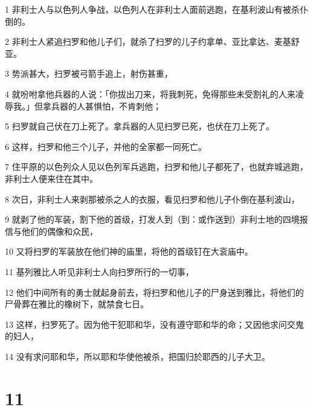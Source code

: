 \par 1 非利士人与以色列人争战，以色列人在非利士人面前逃跑，在基利波山有被杀仆倒的。
\par 2 非利士人紧追扫罗和他儿子们，就杀了扫罗的儿子约拿单、亚比拿达、麦基舒亚。
\par 3 势派甚大，扫罗被弓箭手追上，射伤甚重，
\par 4 就吩咐拿他兵器的人说：「你拔出刀来，将我刺死，免得那些未受割礼的人来凌辱我。」但拿兵器的人甚惧怕，不肯刺他；
\par 5 扫罗就自己伏在刀上死了。拿兵器的人见扫罗已死，也伏在刀上死了。
\par 6 这样，扫罗和他三个儿子，并他的全家都一同死亡。
\par 7 住平原的以色列众人见以色列军兵逃跑，扫罗和他儿子都死了，也就弃城逃跑，非利士人便来住在其中。
\par 8 次日，非利士人来剥那被杀之人的衣服，看见扫罗和他儿子仆倒在基利波山，
\par 9 就剥了他的军装，割下他的首级，打发人到（到：或作送到）非利士地的四境报信与他们的偶像和众民，
\par 10 又将扫罗的军装放在他们神的庙里，将他的首级钉在大衮庙中。
\par 11 基列雅比人听见非利士人向扫罗所行的一切事，
\par 12 他们中间所有的勇士就起身前去，将扫罗和他儿子的尸身送到雅比，将他们的尸骨葬在雅比的橡树下，就禁食七日。
\par 13 这样，扫罗死了。因为他干犯耶和华，没有遵守耶和华的命；又因他求问交鬼的妇人，
\par 14 没有求问耶和华，所以耶和华使他被杀，把国归於耶西的儿子大卫。

\chapter{11}

